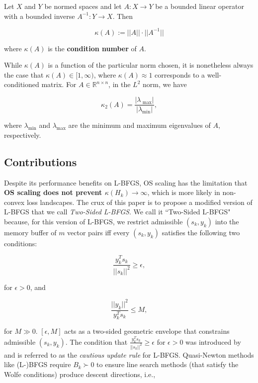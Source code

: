 \documentclass[twoside,11pt]{article}
\begin{document}
\begin{definition}
Let $X$ and $Y$ be normed spaces and let $A: X \rightarrow Y$ be a bounded linear operator with a bounded inverse $A^{-1}: Y \rightarrow X$. Then

\[
\kappa(A) := ||A|| \cdot ||A^{-1}||
\]

\noindent
where $\kappa(A)$ is the \textbf{condition number} of $A$.
\end{definition}

\noindent
While $\kappa(A)$ is a function of the particular norm chosen, it is nonetheless always the case that $\kappa(A) \in [1,\infty)$, where $\kappa(A) \approx 1$ corresponds to a well-conditioned matrix. For $A \in \mathbb{R}^{n \times n}$, in the $L^2$ norm, we have

\begin{equation}
\kappa_2(A) = \frac{|\lambda_{\text{ max}}|}{|\lambda_{\text{min}}|},
\end{equation}

\noindent
where $\lambda_{\text{min}}$ and $\lambda_{\text{max}}$ are the minimum and maximum eigenvalues of $A$, respectively.

\subsection{Contributions}

Despite its performance benefits on L-BFGS, OS scaling has the limitation that \textbf{OS scaling does not prevent $\kappa(H_k) \rightarrow \infty$}, which is more likely in non-convex loss landscapes. The crux of this paper is to propose a modified version of L-BFGS that we call \textit{Two-Sided L-BFGS}. We call it ``Two-Sided L-BFGS" because, for this version of L-BFGS, we restrict admissible $(s_k, y_k)$ into the memory buffer of $m$ vector pairs iff every $(s_k, y_k)$ satisfies the following two conditions:

\begin{equation}
\frac{y_k^T s_k}{||s_k||^2} \geq \epsilon,
\end{equation}

\noindent
for $\epsilon > 0$, and

\begin{equation}
\frac{||y_k||^2}{y_k^Ts_k} \leq M,
\end{equation}

\noindent
for $M \gg 0$. $[\epsilon, M]$ acts as a two-sided geometric envelope that constrains admissible $(s_k, y_k)$. The condition that $\frac{y_k^T s_k}{||s_k||^2} \geq \epsilon$ for $\epsilon > 0$ was introduced by \cite{LF01-JCAM} and is referred to as the \textit{cautious update rule} for L-BFGS. Quasi-Newton methods like (L-)BFGS require $B_k \succ 0$ to ensure line search methods (that satisfy the Wolfe conditions) produce descent directions, i.e.,
\end{document}
